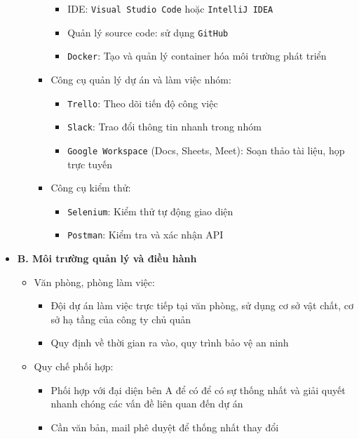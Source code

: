 \begin{itemize}
\begin{itemize}
\begin{itemize}
\begin{itemize}
            \item IDE: \texttt{Visual Studio Code} hoặc \texttt{IntelliJ IDEA}
            \item Quản lý source code: sử dụng \texttt{GitHub}
            \item \texttt{Docker}: Tạo và quản lý container hóa môi trường phát triển
        \end{itemize}
        \item Công cụ quản lý dự án và làm việc nhóm:
        \begin{itemize}
            \item \texttt{Trello}: Theo dõi tiến độ công việc
            \item \texttt{Slack}: Trao đổi thông tin nhanh trong nhóm
            \item \texttt{Google Workspace} (Docs, Sheets, Meet): Soạn thảo tài liệu, họp trực tuyến
        \end{itemize}
        \item Công cụ kiểm thử:
        \begin{itemize}
            \item \texttt{Selenium}: Kiểm thử tự động giao diện
            \item \texttt{Postman}: Kiểm tra và xác nhận API
        \end{itemize}
    \end{itemize}    
\end{itemize}
\item \textbf{B. Môi trường quản lý và điều hành}
\begin{itemize}
    \item Văn phòng, phòng làm việc:
    \begin{itemize}
        \item Đội dự án làm việc trực tiếp tại văn phòng, sử dụng cơ sở vật chất, cơ sở hạ tầng của công ty chủ quản
        \item Quy định về thời gian ra vào, quy trình bảo vệ an ninh
    \end{itemize}
    \item Quy chế phối hợp:
    \begin{itemize}
        \item Phối hợp với đại diện bên A để có để có sự thống nhất và giải quyết nhanh chóng các vấn đề liên quan đến dự án
        \item Cần văn bản, mail phê duyệt để thống nhất thay đổi
    \end{itemize}
\end{itemize}
\end{itemize}

